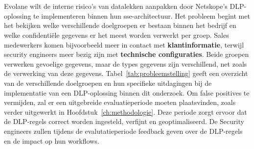 \section{}%
\label{sec:probleemstelling}


Evolane wilt de interne risico's van datalekken aanpakken door Netskope's DLP-oplossing te implementeren binnen hun \gls{sse}-architectuur.
Het probleem begint met het bekijken welke verschillende doelgroepen er bestaan binnen het bedrijf en welke confidentiële gegevens er het meest worden verwerkt per groep.
Sales medewerkers komen bijvoorbeeld meer in contact met \textbf{klantinformatie}, terwijl security engineers meer bezig zijn met \textbf{technische configuraties}.
Beide groepen verwerken gevoelige gegevens, maar de types gegevens zijn verschillend, net zoals de verwerking van deze gegevens.
Tabel~\ref{tab:probleemstelling} geeft een overzicht van de verschillende doelgroepen en hun specifieke uitdagingen bij de implementatie van een DLP-oplossing binnen dit onderzoek.
Om false positives te vermijden, zal er een uitgebreide evaluatieperiode moeten plaatsvinden, zoals verder uitgewerkt in Hoofdstuk~\ref{ch:methodologie}.
Deze periode zorgt ervoor dat de DLP-regels correct worden ingesteld, verfijnt en geoptimaliseerd.
De Security engineers zullen tijdens de evalutatieperiode feedback geven over de DLP-regels en de impact op hun workflows.

